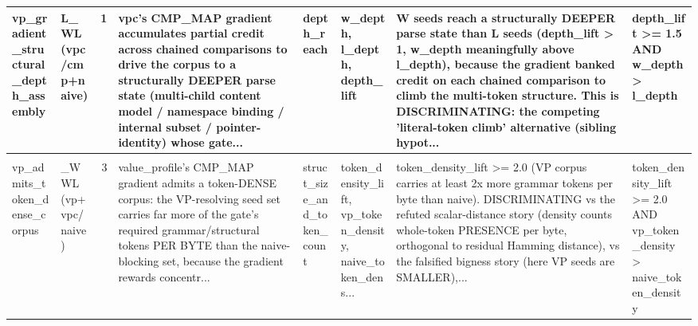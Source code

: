 \documentclass[7pt]{extarticle}
\begin{document}
{\begin{longtable}{@{}p{2.4cm}p{1.9cm}rp{4.3cm}p{1.5cm}p{1.7cm}p{4.6cm}p{3.0cm}@{}}
vp\_\allowbreak gradient\_\allowbreak structural\_\allowbreak depth\_\allowbreak assembly & L\_\allowbreak WL (vpc/cmp+naive) & 1 & vpc's CMP\_\allowbreak MAP gradient accumulates partial credit across chained comparisons to drive the corpus to a structurally DEEPER parse state (multi-child content model / namespace binding / internal subset / pointer-identity) whose gate... & depth\_\allowbreak reach & w\_\allowbreak depth, l\_\allowbreak depth, depth\_\allowbreak lift & W seeds reach a structurally DEEPER parse state than L seeds (depth\_\allowbreak lift \textgreater{} 1, w\_\allowbreak depth meaningfully above l\_\allowbreak depth), because the gradient banked credit on each chained comparison to climb the multi-token structure. This is DISCRIMINATING: the competing 'literal-token climb' alternative (sibling hypot... & depth\_\allowbreak lift \textgreater{}= 1.5 AND w\_\allowbreak depth \textgreater{} l\_\allowbreak depth\\
\midrule
\rowcolor{black!10}\multicolumn{8}{@{}l}{\textbf{[VP-pro]\ \ vp\_\allowbreak admits\_\allowbreak structurally\_\allowbreak richer\_\allowbreak corpus}\quad(final feature, n=5)}\\
vp\_\allowbreak admits\_\allowbreak token\_\allowbreak dense\_\allowbreak corpus & \_\allowbreak WWL (vp+vpc/naive) & 3 & value\_\allowbreak profile's CMP\_\allowbreak MAP gradient admits a token-DENSE corpus: the VP-resolving seed set carries far more of the gate's required grammar/structural tokens PER BYTE than the naive-blocking set, because the gradient rewards concentr... & struct\_\allowbreak size\_\allowbreak and\_\allowbreak token\_\allowbreak count & token\_\allowbreak density\_\allowbreak lift, vp\_\allowbreak token\_\allowbreak density, naive\_\allowbreak token\_\allowbreak dens... & token\_\allowbreak density\_\allowbreak lift \textgreater{}= 2.0 (VP corpus carries at least 2x more grammar tokens per byte than naive). DISCRIMINATING vs the refuted scalar-distance story (density counts whole-token PRESENCE per byte, orthogonal to residual Hamming distance), vs the falsified bigness story (here VP seeds are SMALLER),... & token\_\allowbreak density\_\allowbreak lift \textgreater{}= 2.0 AND vp\_\allowbreak token\_\allowbreak density \textgreater{} naive\_\allowbreak token\_\allowbreak density\\

\end{longtable}}
\end{document}

